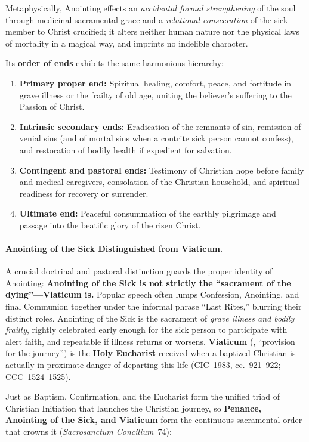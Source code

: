 Metaphysically, Anointing effects an \emph{accidental formal strengthening} of the soul through medicinal sacramental grace and a \emph{relational consecration} of the sick member to Christ crucified; it alters neither human nature nor the physical laws of mortality in a magical way, and imprints no indelible character.

Its \textbf{order of ends} exhibits the same harmonious hierarchy:
\begin{enumerate}
  \item \textbf{Primary proper end:} Spiritual healing, comfort, peace, and fortitude in grave illness or the frailty of old age, uniting the believer's suffering to the Passion of Christ.
  \item \textbf{Intrinsic secondary ends:} Eradication of the remnants of sin, remission of venial sins (and of mortal sins when a contrite sick person cannot confess), and restoration of bodily health if expedient for salvation.
  \item \textbf{Contingent and pastoral ends:} Testimony of Christian hope before family and medical caregivers, consolation of the Christian household, and spiritual readiness for recovery or surrender.
  \item \textbf{Ultimate end:} Peaceful consummation of the earthly pilgrimage and passage into the beatific glory of the risen Christ.
\end{enumerate}

\paragraph{Anointing of the Sick Distinguished from Viaticum.}
A crucial doctrinal and pastoral distinction guards the proper identity of Anointing: \textbf{Anointing of the Sick is not strictly the ``sacrament of the dying''---Viaticum is.} Popular speech often lumps Confession, Anointing, and final Communion together under the informal phrase ``Last Rites,'' blurring their distinct roles. Anointing of the Sick is the sacrament of \emph{grave illness and bodily frailty}, rightly celebrated early enough for the sick person to participate with alert faith, and repeatable if illness returns or worsens. \textbf{Viaticum} (, ``provision for the journey'') is the \textbf{Holy Eucharist} received when a baptized Christian is actually in proximate danger of departing this life (CIC~1983, cc.~921--922; CCC~1524--1525).

Just as Baptism, Confirmation, and the Eucharist form the unified triad of Christian Initiation that launches the Christian journey, so \textbf{Penance, Anointing of the Sick, and Viaticum} form the continuous sacramental order that crowns it (\emph{Sacrosanctum Concilium}~74):

